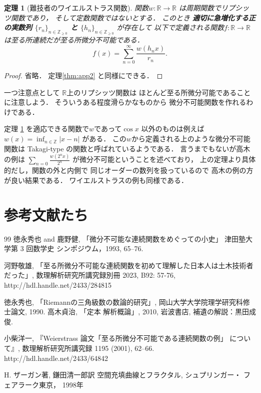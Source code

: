 \documentclass[leqno, a4paper, 12pt]{jsarticle}
\newtheorem{thm}{定理}
\newcommand{\zz}{\mathbb{Z}}
\newcommand{\rr}{\mathbb{R}}
\begin{document}
\begin{thm}[難技者のワイエルストラス関数]\label{thm:app3}
関数$w\colon \rr\to \rr$
は周期関数でリプシッツ関数であり，
そして定数関数ではないとする．
このとき
\textbf{適切に急増化する正の実数列
$\{r_{n}\}_{n\in \zz_{\ge 0}}$
と
$\{h_{n}\}_{n\in \zz_{\ge 0}}$}
が存在して
以下で定義される関数$f\colon \rr\to \rr$
は至る所連続だが至る所微分不可能である．
\[
f(x)=\sum_{n=0}^{\infty}\frac{w(h_{n}x)}{r_{n}}.
\]
\end{thm}
\begin{proof}
省略．
定理\ref{thm:app2}
と同様にできる．
\end{proof}
一つ注意点として
$\rr$上のリプシッツ関数は
ほとんど至る所微分可能であることに注意しよう．
そういうある程度滑らかなものから
微分不可能関数を作れるわけである．

定理
\ref{thm:app3}
を適応できる関数で$w$であって$\cos x$
以外のものは例えば
$w(x)=\inf_{n\in \zz}|x-n|$
がある．
この$w$から定義される上のような微分不可能関数は
Takagi-type の関数と呼ばれているようである．
言うまでもないが高木の例は
$\sum_{n=0}\frac{w(2^{n}x)}{2^{n}}$
が微分不可能ということを述べており，
上の定理より具体的だし，関数の外と内側で
同じオーダーの数列を扱っているので
高木の例の方が良い結果である．
ワイエルストラスの例も同様である．

\section*{参考文献たち}


\renewcommand{\refname}{和文参考文献}

\begin{thebibliography}{99}
徳永秀也 and 鹿野健, 
「微分不可能な連続関数をめぐっての小史」
津田塾大学第 3 回数学史
シンポジウム，1993, 
65--76.

河野敬雄, 
「至る所微分不可能な連続関数を初めて理解した日本人は土木技術者だった」, 
 数理解析研究所講究録別冊 2023, B92: 57-76, 
 http://hdl.handle.net/2433/284815
 
 徳永秀也, 
 「Riemannの三角級数の数論的研究」, 
 岡山大学大学院理学研究科修士論文, 
 1990. 
 高木貞治, 
 「定本 解析概論」, 
 2010, 
 岩波書店, 
 補遺の解説：黒田成俊.
 
 小柴洋一, 
『Weierstrass 論文「至る所微分不可能である連続関数の例」
について』, 
数理解析研究所講究録
1195
(2001), 
62--66. 
http://hdl.handle.net/2433/64842

H. ザーガン著, 
鎌田清一郎訳
空間充填曲線とフラクタル, 
シュプリンガー・
フェアラーク東京，
1998年
\end{thebibliography}



\renewcommand{\refname}{一般の参考文献}
\nocite{*}


\end{document}
